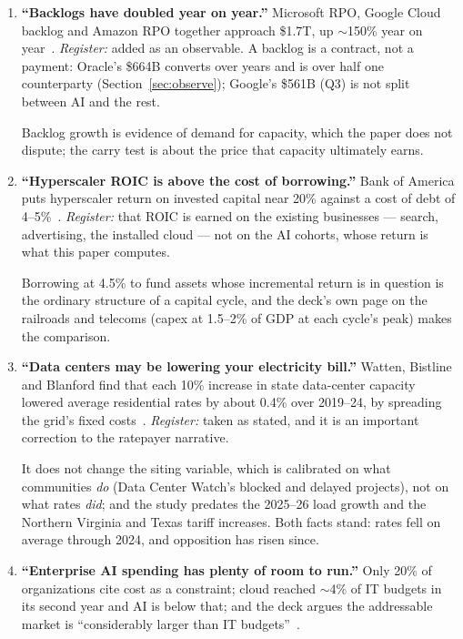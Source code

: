 \documentclass[11pt,letterpaper]{article}
\begin{document}
\begin{enumerate}
\item \textbf{``Backlogs have doubled year on year.''} Microsoft RPO, Google Cloud backlog and Amazon RPO together approach \$1.7T, up $\sim$150\% year on year~\cite{ref:a16z_som}. \emph{Register:} added as an observable. A backlog is a contract, not a payment: Oracle's \$664B converts over years and is over half one counterparty (Section~\ref{sec:observe}); Google's \$561B (Q3) is not split between AI and the rest.

Backlog growth is evidence of demand for capacity, which the paper does not dispute; the carry test is about the price that capacity ultimately earns.

\item \textbf{``Hyperscaler ROIC is above the cost of borrowing.''} Bank of America puts hyperscaler return on invested capital near 20\% against a cost of debt of 4--5\%~\cite{ref:a16z_som}. \emph{Register:} that ROIC is earned on the existing businesses --- search, advertising, the installed cloud --- not on the AI cohorts, whose return is what this paper computes.

Borrowing at 4.5\% to fund assets whose incremental return is in question is the ordinary structure of a capital cycle, and the deck's own page on the railroads and telecoms (capex at 1.5--2\% of GDP at each cycle's peak) makes the comparison.

\item \textbf{``Data centers may be lowering your electricity bill.''} Watten, Bistline and Blanford find that each 10\% increase in state data-center capacity lowered average residential rates by about 0.4\% over 2019--24, by spreading the grid's fixed costs~\cite{ref:watten2026}. \emph{Register:} taken as stated, and it is an important correction to the ratepayer narrative.

It does not change the siting variable, which is calibrated on what communities \emph{do} (Data Center Watch's blocked and delayed projects), not on what rates \emph{did}; and the study predates the 2025--26 load growth and the Northern Virginia and Texas tariff increases. Both facts stand: rates fell on average through 2024, and opposition has risen since.

\item \textbf{``Enterprise AI spending has plenty of room to run.''} Only 20\% of organizations cite cost as a constraint; cloud reached $\sim$4\% of IT budgets in its second year and AI is below that; and the deck argues the addressable market is ``considerably larger than IT budgets''~\cite{ref:a16z_som}.


\end{enumerate}
\end{document}
